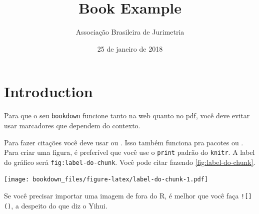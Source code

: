 \documentclass[12pt,]{report}
\title{Book Example}
\author{Associação Brasileira de Jurimetria}
\date{25 de janeiro de 2018}
\let\origfigure\figure
\let\endorigfigure\endfigure
\renewenvironment{figure}[1][2] {
    \expandafter\origfigure\expandafter[H]
} {
    \endorigfigure
}
\begin{document}
\maketitle

{
\hypersetup{linkcolor=black}
\setcounter{tocdepth}{2}
\tableofcontents
}
\listoftables
\listoffigures
\chapter{Introduction}\label{introducao-2}

Para que o seu \texttt{bookdown} funcione tanto na web quanto no pdf,
você deve evitar usar marcadores que dependem do contexto.

Para fazer citações você deve usar \citep{Weinstein1997} ou
\citet{Weinstein1997}. Isso também funciona pra pacotes \citep{R-base}
ou \citet{R-base}. Para criar uma figura, é preferível que você use o
\texttt{print} padrão do \texttt{knitr}. A label do gráfico será
\texttt{fig:label-do-chunk}. Você pode citar fazendo
\ref{fig:label-do-chunk}.

\begin{figure}
\centering
\texttt{[image: bookdown\_files/figure-latex/label-do-chunk-1.pdf]}
\caption{\label{fig:label-do-chunk}Este é um gráfico.}
\end{figure}

Se você precisar importar uma imagem de fora do R, é melhor que você
faça \texttt{!{[}{]}()}, a despeito do que diz o Yihui.
\end{document}
